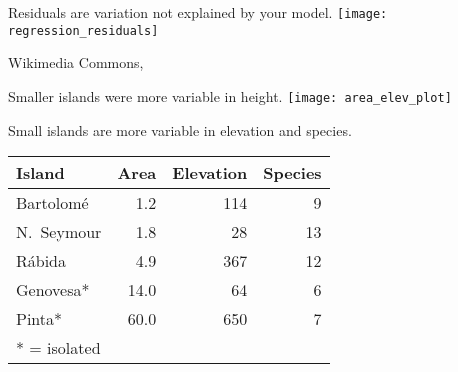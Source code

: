 \documentclass[t]{beamer}
\begin{document}
\begin{frame}{Residuals are variation not explained by your model.}
\vspace{-\baselineskip}\centering
\texttt{[image: regression\_residuals]}

\vfilll

\tiny \hfill Wikimedia Commons, 
\end{frame}


\begin{frame}{Smaller islands were more variable in height.}
	\centering
		\texttt{[image: area\_elev\_plot]}
\end{frame}

\begin{frame}{Small islands are more variable in elevation and species.}
\centering
\begin{tabular}{lrrr}
	\toprule
	Island	& 	Area	& 	Elevation	& Species \tabularnewline
	\midrule
	Bartolomé	&	1.2	& 114	& 9 \tabularnewline
	N.~Seymour	&	1.8	&	28	& 13 \tabularnewline
	Rábida		&	4.9	&	367	& 12	\tabularnewline
	Genovesa* 	&	14.0	&	64	&	6	\tabularnewline
	Pinta*		&	60.0	&	650	&	7	\tabularnewline
	\bottomrule \addlinespace[\belowrulesep] %
	* = isolated &&&\tabularnewline
\end{tabular}

\end{frame}
\end{document}
